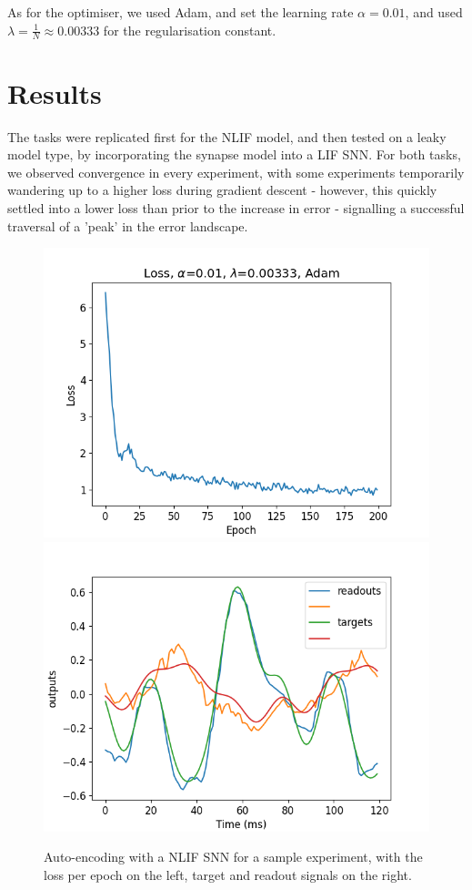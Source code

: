 \documentclass[mphil,deptreport,ianc]{infthesis} %
\begin{document}
As for the optimiser, we used Adam, and set the learning rate $\alpha=0.01$, and used $\lambda = \frac{1}{N} \approx 0.00333$ for the regularisation constant.


\section{Results}

The tasks were replicated first for the NLIF model, and then tested on a leaky model type, by incorporating the synapse model into a LIF SNN.
For both tasks, we observed convergence in every experiment, with some experiments temporarily wandering up to a higher loss during gradient descent - however, this quickly settled into a lower loss than prior to the increase in error - signalling a successful traversal of a 'peak' in the error landscape.


\begin{figure}
    \centering
    \includegraphics[width=0.49\columnwidth]{figures/Gating/AutoEncoding/NLIF_sample/plot_loss_test_mt_NLIF_et_AutoEncoding_N_30_titers_200.png}
    \includegraphics[width=0.49\columnwidth]{figures/Gating/AutoEncoding/NLIF_sample/test_plot_outputs_NLIF_seed_23.png}
    \caption{Auto-encoding with a NLIF SNN for a sample experiment, with the loss per epoch on the left, target and readout signals on the right.}
    \label{fig:autoencoding_NLIF}
\end{figure}
\end{document}
